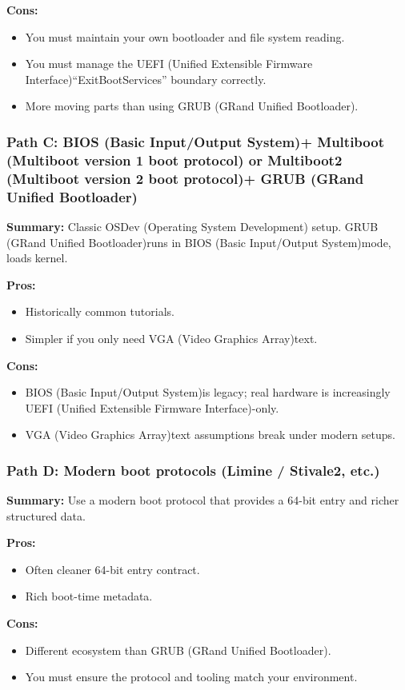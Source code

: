 \documentclass[11pt]{article}
\newcommand{\BIOS}{BIOS (Basic Input/Output System)}
\newcommand{\GRUB}{GRUB (GRand Unified Bootloader)}
\newcommand{\MBtwo}{Multiboot2 (Multiboot version 2 boot protocol)}
\newcommand{\UEFI}{UEFI (Unified Extensible Firmware Interface)}
\newcommand{\VGA}{VGA (Video Graphics Array)}
\begin{document}
\textbf{Cons:}
\begin{itemize}
  \item You must maintain your own bootloader and file system reading.
  \item You must manage the \UEFI ``ExitBootServices'' boundary correctly.
  \item More moving parts than using \GRUB.
\end{itemize}

\subsubsection{Path C: \BIOS + Multiboot (Multiboot version 1 boot protocol) or \MBtwo + \GRUB}
\textbf{Summary:} Classic OSDev (Operating System Development) setup. \GRUB runs in \BIOS mode, loads kernel.

\textbf{Pros:}
\begin{itemize}
  \item Historically common tutorials.
  \item Simpler if you only need \VGA text.
\end{itemize}

\textbf{Cons:}
\begin{itemize}
  \item \BIOS is legacy; real hardware is increasingly \UEFI-only.
  \item \VGA text assumptions break under modern setups.
\end{itemize}

\subsubsection{Path D: Modern boot protocols (Limine / Stivale2, etc.)}
\textbf{Summary:} Use a modern boot protocol that provides a 64-bit entry and richer structured data.

\textbf{Pros:}
\begin{itemize}
  \item Often cleaner 64-bit entry contract.
  \item Rich boot-time metadata.
\end{itemize}

\textbf{Cons:}
\begin{itemize}
  \item Different ecosystem than \GRUB.
  \item You must ensure the protocol and tooling match your environment.
\end{itemize}
\end{document}
